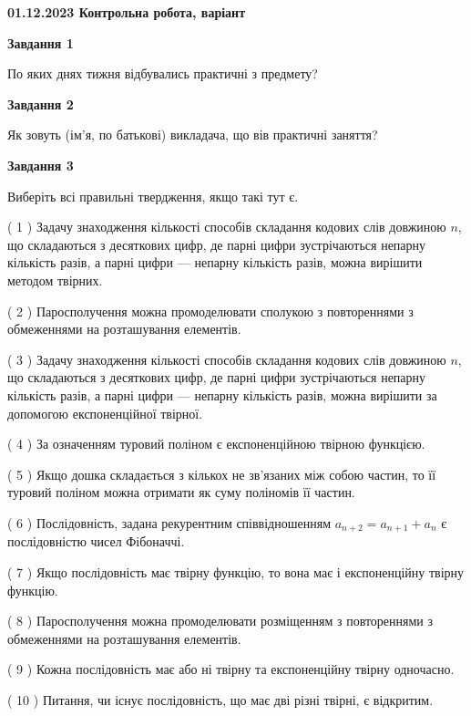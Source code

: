 \documentclass[12pt, ukrainian]{article}
\begin{document}
\begin {large}

\textbf{01.12.2023 Контрольна робота, варіант  }\par


{
{\begin {center}\textbf{Завдання 1}\end {center}}\par
По яких днях тижня відбувались практичні з предмету?\par
{\begin {center}\textbf{Завдання 2}\end {center}}\par
Як зовуть (ім'я, по батькові) викладача, що вів практичні заняття?\par
{\begin {center}\textbf{Завдання 3}\end {center}}\par
Виберіть всі правильні твердження, якщо такі тут є.\par
\vspace{2mm}
( 1 ) Задачу знаходження кількості способів складання кодових слів довжиною $n$, що складаються з десяткових цифр, де парні цифри зустрічаються непарну кількість разів, а парні цифри — непарну кількість разів, можна вирішити методом твірних.%

( 2 ) Паросполучення можна промоделювати сполукою з повтореннями з обмеженнями на розташування елементів.%

( 3 ) Задачу знаходження кількості способів складання кодових слів довжиною $n$, що складаються з десяткових цифр, де парні цифри зустрічаються непарну кількість разів, а парні цифри — непарну кількість разів, можна вирішити за допомогою експоненційної твірної.%

( 4 ) За означенням туровий поліном є експоненційною твірною функцією.%

( 5 ) Якщо дошка складається з кількох не зв’язаних між собою частин, то її туровий поліном можна отримати як суму поліномів її частин.%

( 6 ) Послідовність, задана рекурентним співвідношенням $a_{n+2}=a_{n+1}+a_{n}$ є послідовністю чисел Фібоначчі.%

( 7 ) Якщо послідовність має твірну функцію, то вона має і експоненційну твірну функцію.%

( 8 ) Паросполучення можна промоделювати розміщенням з повтореннями з обмеженнями на розташування елементів.%

( 9 ) Кожна послідовність має або ні твірну та експоненційну твірну одночасно.%

( 10 ) Питання, чи існує послідовність, що має дві різні твірні, є відкритим.%
}
\end {large}

\vspace{4mm}
\newpage
\end{document}
